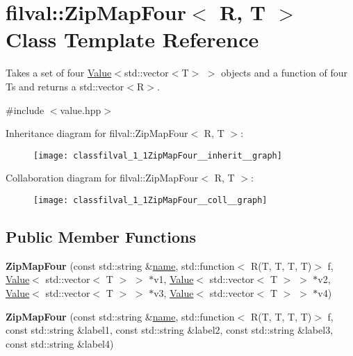 \hypertarget{classfilval_1_1ZipMapFour}{}\section{filval\+:\+:Zip\+Map\+Four$<$ R, T $>$ Class Template Reference}
\label{classfilval_1_1ZipMapFour}


Takes a set of four \hyperlink{classfilval_1_1Value}{Value}$<$std\+::vector$<$\+T$>$ $>$ objects and a function of four Ts and returns a std\+::vector$<$\+R$>$.  




{\ttfamily \#include $<$value.\+hpp$>$}



Inheritance diagram for filval\+:\+:Zip\+Map\+Four$<$ R, T $>$\+:
\nopagebreak
\begin{figure}[H]
\begin{center}
\leavevmode
\texttt{[image: classfilval\_1\_1ZipMapFour\_\_inherit\_\_graph]}
\end{center}
\end{figure}


Collaboration diagram for filval\+:\+:Zip\+Map\+Four$<$ R, T $>$\+:
\nopagebreak
\begin{figure}[H]
\begin{center}
\leavevmode
\texttt{[image: classfilval\_1\_1ZipMapFour\_\_coll\_\_graph]}
\end{center}
\end{figure}
\subsection*{Public Member Functions}
\begin{DoxyCompactItemize}
\item 
\hypertarget{classfilval_1_1ZipMapFour_aa26f94e0c134eaab81bd32de42ee1832}{}\label{classfilval_1_1ZipMapFour_aa26f94e0c134eaab81bd32de42ee1832} 
{\bfseries Zip\+Map\+Four} (const std\+::string \&\hyperlink{classfilval_1_1GenValue_a007e38c03ee041c2a657afa3d6e91ab1}{name}, std\+::function$<$ R(T, T, T, T)$>$ f, \hyperlink{classfilval_1_1Value}{Value}$<$ std\+::vector$<$ T $>$ $>$ $\ast$v1, \hyperlink{classfilval_1_1Value}{Value}$<$ std\+::vector$<$ T $>$ $>$ $\ast$v2, \hyperlink{classfilval_1_1Value}{Value}$<$ std\+::vector$<$ T $>$ $>$ $\ast$v3, \hyperlink{classfilval_1_1Value}{Value}$<$ std\+::vector$<$ T $>$ $>$ $\ast$v4)
\item 
\hypertarget{classfilval_1_1ZipMapFour_a0a8eaff3d9f7aabf88d97ed6dda907f0}{}\label{classfilval_1_1ZipMapFour_a0a8eaff3d9f7aabf88d97ed6dda907f0} 
{\bfseries Zip\+Map\+Four} (const std\+::string \&\hyperlink{classfilval_1_1GenValue_a007e38c03ee041c2a657afa3d6e91ab1}{name}, std\+::function$<$ R(T, T, T, T)$>$ f, const std\+::string \&label1, const std\+::string \&label2, const std\+::string \&label3, const std\+::string \&label4)
\end{DoxyCompactItemize}
